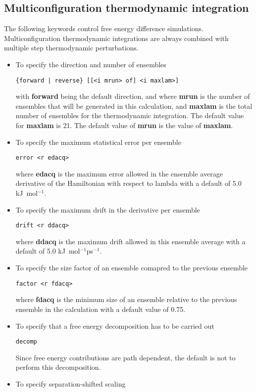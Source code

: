 \subsection{Multiconfiguration thermodynamic integration}
The following keywords control free energy difference simulations.
Multiconfiguration thermodynamic integrations are always combined
with multiple step thermodynamic perturbations.
\begin{itemize}
\item
To specify the direction and number of ensembles
\begin{verbatim}
{forward | reverse} [[<i mrun> of] <i maxlam>]
\end{verbatim}
with {\bf forward} being the default direction, and
where {\bf mrun} is the number of ensembles that will be generated in
this calculation, and {\bf maxlam} is the total number of ensembles
for the thermodynamic integration. The default value for {\bf maxlam}
is 21. The default value of {\bf mrun} is the value of {\bf maxlam}.
\item
To specify the maximum statistical error per ensemble
\begin{verbatim}
error <r edacq>
\end{verbatim}
where {\bf edacq} is the maximum error allowed in the ensemble average 
derivative of the Hamiltonian with respect to lambda with a default
of 5.0 kJ~mol$^{-1}$.
\item
To specify the maximum drift in the derivative per ensemble
\begin{verbatim}
drift <r ddacq>
\end{verbatim}
where {\bf ddacq} is the maximum drift allowed in this
ensemble average with a default of 5.0 kJ~mol$^{-1}$ps$^{-1}$.
\item
To specify the size factor of an ensemble comapred to the previous
ensemble
\begin{verbatim}
factor <r fdacq>
\end{verbatim}
where {\bf fdacq} is the minimum size of an ensemble relative to the
previous ensemble in the calculation with a default value of 0.75.
\item
To specify that a free energy decomposition has to be carried out
\begin{verbatim}
decomp
\end{verbatim}
Since free energy contributions are path dependent, the default is not
to perform this decomposition.
\item
To specify separation-shifted scaling
\begin{verbatim}

\end{verbatim}
\end{itemize}
